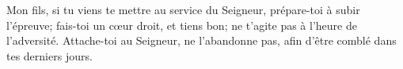 Mon fils, si tu viens te mettre au service du Seigneur,
	prépare-toi à subir l’épreuve;
	fais-toi un cœur droit, et tiens bon;
	ne t’agite pas à l’heure de l’adversité.
Attache-toi au Seigneur, ne l’abandonne pas,
	afin d’être comblé dans tes derniers jours.
